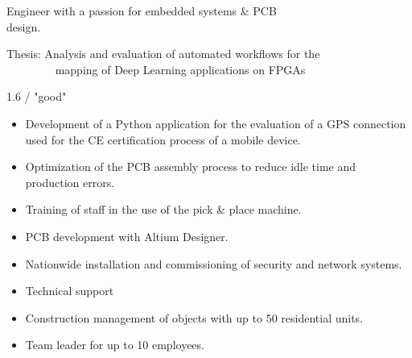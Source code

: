 \documentclass[10pt,a4paper,ragged2e,withhyper]{altacv}
\begin{document}
\begin{paracol}{2}
%
%
\large{Engineer with a passion for embedded systems \& PCB \\design.}\par
\medskip
%
%
%
\divider
%
\small{\faBook\hspace{0.5em} Thesis: Analysis and evaluation of automated workflows for the\\~~~~~~~~ mapping of Deep Learning applications on FPGAs}\par
\small{\faGraduationCap\hspace{0.5em} 1.6 / "good"}\par
\medskip
%
%
\begin{itemize}
\item Development of a Python application for the evaluation of a GPS connection used for the CE certification process of a mobile device.
\item Optimization of the PCB assembly process to reduce idle time and production errors.
\item Training of staff in the use of the pick \& place machine.
\item PCB development with Altium Designer.
\end{itemize}
%
\divider
%
\begin{itemize}
\item Nationwide installation and commissioning of security and network systems.
\item Technical support
\end{itemize}
%
\divider
%
\begin{itemize}
\item Construction management of objects with up to 50 residential units.
\item Team leader for up to 10 employees.
\end{itemize}
%
%
\switchcolumn

\end{paracol}
\end{document}
